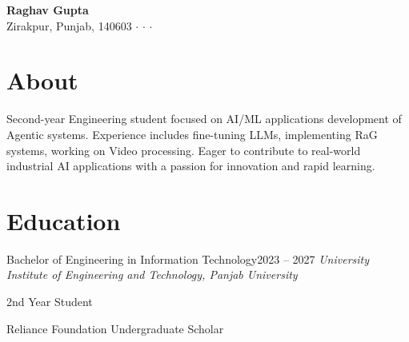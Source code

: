 \documentclass[10pt, letterpaper]{article}
\newcommand{\contactdivider}{\hspace{0.2cm}$\cdot$\hspace{0.2cm}}
\newcommand{\headernamestyle}[1]{{\fontsize{28pt}{32pt}\selectfont\textbf{#1}}}
\begin{document}

\begin{center}
    \headernamestyle{Raghav Gupta}\\[0.25cm]
    \footnotesize
    {\faMapMarker*} Zirakpur, Punjab, 140603 \contactdivider
     \contactdivider
     \contactdivider
\end{center}

\section{About}
\begin{minipage}{\linewidth}
Second-year Engineering student focused on AI/ML applications development of Agentic systems. Experience includes fine-tuning LLMs, implementing RaG systems, working on Video processing. Eager to contribute to real-world industrial AI applications with a passion for innovation and rapid learning.
\end{minipage}

\section{Education}
\begin{educationentry}{Bachelor of Engineering in Information Technology}{2023 -- 2027}
\textit{University Institute of Engineering and Technology, Panjab University}
\begin{achievementlist}
    \item 2nd Year Student
    \item Reliance Foundation Undergraduate Scholar
\end{achievementlist}
\end{educationentry}

\end{document}
